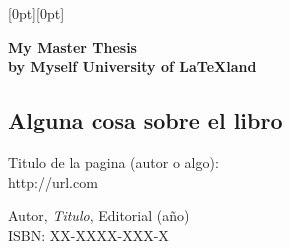 \documentclass[12pt]{book}
\newlength{\PictHOffset}
\newlength{\PictVOffset}
\begin{document}
\begin{titlepage}
   \noindent\hspace*{-\PictHOffset}%
   \raisebox{\PictVOffset}[0pt][0pt]{}

   \begin{center}
      \vfill
      \bfseries \Huge My Master Thesis \\[3cm]
      by Myself
      \vfill
     University of \LaTeX land
   \end{center}
\end{titlepage}

\thispagestyle{empty}
\subsection*{\center \normalsize Alguna cosa sobre el libro}
 
\tableofcontents 
\mainmatter


 
\begin{thebibliography}{99}
  
Titulo de la pagina (autor o algo): \\
http://url.com
 
Autor, \emph{Titulo}, Editorial (año) \\
ISBN: XX-XXXX-XXX-X
 
\end{thebibliography}
 
\end{document}

